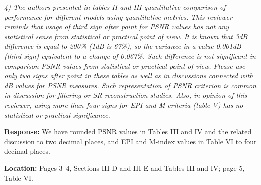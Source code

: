 \documentclass[11pt,letterpaper]{article}
\begin{document}
\textit{4) The authors presented in tables II and III quantitative comparison of performance for different models using quantitative metrics. This reviewer reminds that usage of third sign after point for PSNR values has not any statistical sense from statistical or practical point of view. It is known that 3dB difference is equal to 200\% (1dB is 67\%), so the variance in a value 0.001dB (third sign) equivalent to a change of 0,067\%. Such difference is not significant in comparison PSNR values from statistical or practical point of view. Please use only two signs after point in these tables as well as in discussions connected with dB values for PSNR measures. Such representation of PSNR criterion is common in discussion for filtering or SR reconstruction studies. Also, in opinion of this reviewer, using more than four signs for EPI and M criteria (table V) has no statistical or practical significance.}

\medskip
\textbf{Response:} We have rounded PSNR values in Tables III and IV and the related discussion to two decimal places, and EPI and M-index values in Table VI to four decimal places.

\textbf{Location:} Pages 3--4, Sections III-D and III-E and Tables III and IV; page 5, Table VI.
\end{document}
